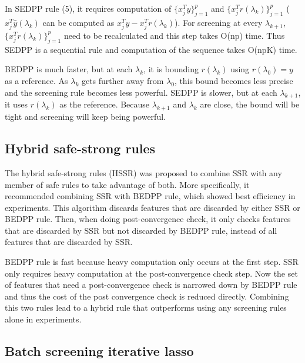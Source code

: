 In SEDPP rule (5), it requires computation of $\{x_j^Ty\}_{j=1}^p$ and $\{x_j^Tr(\lambda_k)\}_{j=1}^p$ ($x_j^T\hat{y}(\lambda_k)$ can be computed as $x_j^Ty-x_j^Tr(\lambda_k)$). For screening at every $\lambda_{k+1}$, $\{x_j^Tr(\lambda_k)\}_{j=1}^p$ need to be recalculated and this step takes O(np) time. Thus SEDPP is a sequential rule and computation of the sequence takes O(npK) time.

BEDPP is much faster, but at each $\lambda_k$, it is bounding $r(\lambda_k)$ using $r(\lambda_0)=y$ as a reference. As $\lambda_k$ gets further away from $\lambda_0$, this bound becomes less precise and the screening rule becomes less powerful. SEDPP is slower, but at each $\lambda_{k+1}$, it uses $r(\lambda_{k})$ as the reference. Because $\lambda_{k+1}$ and $\lambda_k$ are close, the bound will be tight and screening will keep being powerful.

\subsection{Hybrid safe-strong rules}

The hybrid safe-strong rules (HSSR) \citep{Zeng2021} was proposed to combine SSR with any member of safe rules to take advantage of both. More specifically, it recommended  combining SSR with BEDPP rule, which showed best efficiency in experiments. This algorithm discards features that are discarded by either SSR or BEDPP rule. Then, when doing post-convergence check, it only checks features that are discarded by SSR but not discarded by BEDPP rule, instead of all features that are discarded by SSR.

BEDPP rule is fast because heavy computation only occurs at the first step. SSR only requires heavy computation at the post-convergence check step. Now the set of features that need a post-convergence check is narrowed down by BEDPP rule and thus the cost of the post convergence check is reduced directly. Combining this two rules lead to a hybrid rule that outperforms using any screening rules alone in experiments.

\subsection{Batch screening iterative lasso}

